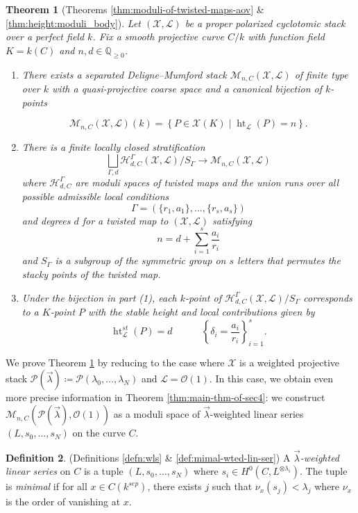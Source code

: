 \documentclass[a4paper,12pt]{amsart}
\newtheorem{thm}{Theorem}[section]
\theoremstyle{definition}
\newtheorem{defn}[thm]{Definition}
\newcommand{\cX}{\mathcal{X}}
\newcommand{\cO}{\mathcal{O}}
\newcommand{\cL}{\mathcal{L}}
\newcommand{\cH}{\mathcal{H}}
\newcommand{\cM}{\mathcal{M}}
\DeclareMathOperator{\height}{ht}
\newcommand{\Pcv}{\mathcal{P}(\vec{\lambda})}
\newcommand{\Pc}{\mathcal{P}}
\newcommand{\lambdavec}{{\vec{\lambda}}}
\begin{document}
	\begin{thm}[Theorems \ref{thm:moduli-of-twisted-maps-aov} \& \ref{thm:height:moduli_body}]\label{thm:height:moduli} Let $(\cX, \cL)$ be a proper polarized cyclotomic stack over a perfect field $k$. Fix a smooth projective curve $C/k$ with function field $K = k(C)$ and $n,d \in \mathbb{Q}_{\ge 0}$.
		
		\begin{enumerate} 
			\item There exists a separated Deligne--Mumford stack $\cM_{n,C}(\cX,\cL)$ of finite type over $k$ with a quasi-projective coarse space and a canonical bijection of $k$-points
			
			$$
			\cM_{n,C}(\cX, \cL)(k) = \left\{ P \in \cX(K) \mid \height_{\cL}(P) = n \right \}.
			$$
			\item There is a finite locally closed stratification 
			$$
			\bigsqcup_{\Gamma,d} %
			\cH^\Gamma_{d,C}(\cX, \cL)/S_\Gamma\to \cM_{n,C}(\cX, \cL)
			$$
			where $\cH^{\Gamma}_{d,C}$ are moduli spaces of twisted maps and the union runs over all possible admissible local conditions
			$$\Gamma = \left(\{r_1, a_1\}, \ldots, \{r_s, a_s\}\right)$$ and degrees $d$ for a twisted map to $(\cX, \cL)$ satisfying
			$$
			n = d + \sum_{i = 1}^s \frac{a_i}{r_i} 
			$$
			and $S_\Gamma$ is a subgroup of the symmetric group on $s$ letters that permutes the stacky points of the twisted map.
			
			\item Under the bijection in part (1), each $k$-point of $\cH_{d,C}^\Gamma(\cX, \cL)/S_\Gamma$ corresponds to a $K$-point $P$ with the stable height and local contributions given by
			$$
			\height^{st}_{\cL}(P) = d \quad \quad \quad \left\{\delta_i = \frac{a_i}{r_i}\right\}_{i = 1}^s. 
			$$
		\end{enumerate}
	\end{thm}
	
	We prove Theorem \ref{thm:height:moduli} by reducing to the case where $\cX$ is a weighted projective stack $\Pcv \coloneqq \Pc(\lambda_0,\dots,\lambda_N)$ and $\cL=\cO(1)$. In this case, we obtain even more precise information in Theorem \ref{thm:main-thm-of-sec4}: we construct $\cM_{n,C}(\Pcv, \cO(1))$ as a moduli space of $\lambdavec$-weighted linear series $(L, s_0, \ldots, s_N)$ on the curve $C$.
	
	\begin{defn} (Definitions \ref{defn:wls} \& \ref{def:mimal-wted-lin-ser})
		A \emph{$\lambdavec$-weighted linear series} on $C$ is a tuple $(L, s_0, \ldots, s_N)$ where $s_i \in H^0(C, L^{\otimes \lambda_i})$. The tuple is \emph{minimal} if for all $x \in C(k^{sep})$, there exists $j$ such that $\nu_x(s_j) < \lambda_j$ where $\nu_x$ is the order of vanishing at $x$. 
	\end{defn}
	
\end{document}
